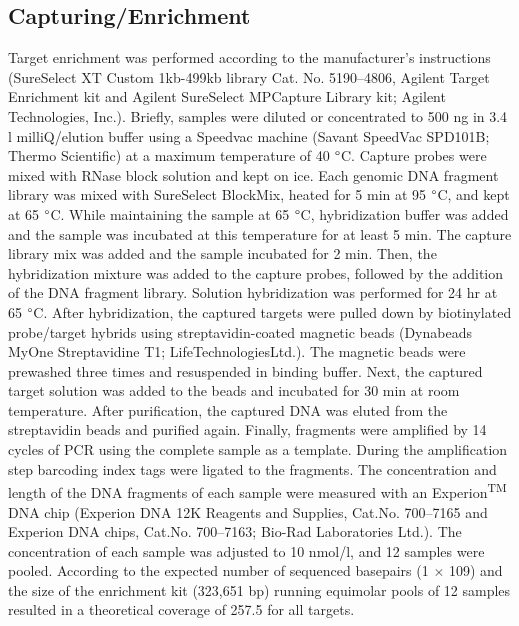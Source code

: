 \subsection{Capturing/Enrichment}
Target enrichment was performed according to the manufacturer’s instructions (SureSelect XT Custom 1kb-499kb library Cat. No. 5190–4806, Agilent Target Enrichment kit and Agilent SureSelect MPCapture Library kit; Agilent Technologies, Inc.).
Briefly, samples were diluted or concentrated to 500 ng in 3.4 {\textmu}l milliQ/elution buffer using a Speedvac machine (Savant SpeedVac SPD101B; Thermo Scientific) at a maximum temperature of 40 $\degree$C. 
Capture probes were mixed with RNase block solution and kept on ice. 
Each genomic DNA fragment library was mixed with SureSelect BlockMix, heated for 5 min at 95 $\degree$C, and kept at 65 $\degree$C. While maintaining the sample at 65 $\degree$C, hybridization buffer was added and the sample was incubated at this temperature for at least 5 min. 
The capture library mix was added and the sample incubated for 2 min. 
Then, the hybridization mixture was added to the capture probes, followed by the addition of the DNA fragment library. 
Solution hybridization was performed for 24 hr at 65 $\degree$C. 
After hybridization, the captured targets were pulled down by biotinylated probe/target hybrids using streptavidin-coated magnetic beads (Dynabeads MyOne Streptavidine T1; LifeTechnologiesLtd.). 
The magnetic beads were prewashed three times and resuspended in binding buffer. 
Next, the captured target solution was added to the beads and incubated for 30 min at room temperature. 
After purification, the captured DNA was eluted from the streptavidin beads and purified again. 
Finally, fragments were amplified by 14 cycles of PCR using the complete sample as a template. 
During the amplification step barcoding index tags were ligated to the fragments. 
The concentration and length of the DNA fragments of each sample were measured with an Experion\textsuperscript{TM} DNA chip (Experion DNA 12K Reagents and Supplies, Cat.No. 700–7165 and Experion DNA chips, Cat.No. 700–7163; Bio-Rad Laboratories Ltd.). 
The concentration of each sample was adjusted to 10 nmol/l, and 12 samples were pooled. 
According to the expected number of sequenced basepairs (1 $\times$ 109) and the size of the enrichment kit (323,651 bp) running equimolar pools of 12 samples resulted in a theoretical coverage of 257.5 for all targets.

